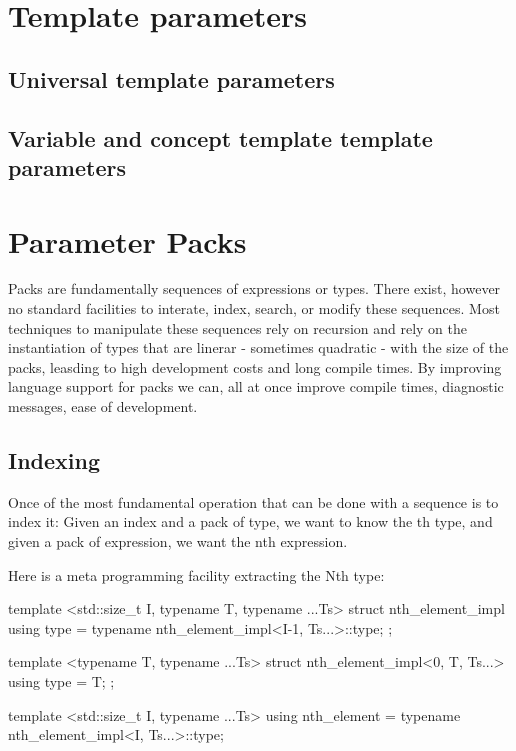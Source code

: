 \documentclass{wg21}
\begin{document}
\section{Template parameters}

\subsection{Universal template parameters}

\subsection{Variable and concept template template parameters}

\section{Parameter Packs}

Packs are fundamentally sequences of expressions or types.
There exist, however no standard facilities to interate, index, search, or modify these sequences.
Most techniques to manipulate these sequences rely on recursion and rely on the instantiation of
types that are linerar - sometimes quadratic - with the size of the packs, leasding to high development costs and long compile times.
By improving language support for packs we can, all at once improve compile times, diagnostic messages, ease of development.

\subsection{Indexing}

Once of the most fundamental operation that can be done with a sequence is to index it:
Given an index  and a pack of type, we want to know the th type, and given a pack of expression, we want the nth expression.

Here is a meta programming facility extracting the Nth type:

\begin{colorblock}
template <std::size_t I, typename T, typename ...Ts>
struct nth_element_impl {
    using type = typename nth_element_impl<I-1, Ts...>::type;
};

template <typename T, typename ...Ts>
struct nth_element_impl<0, T, Ts...> {
    using type = T;
};

template <std::size_t I, typename ...Ts>
using nth_element = typename nth_element_impl<I, Ts...>::type;
\end{colorblock}
\end{document}
